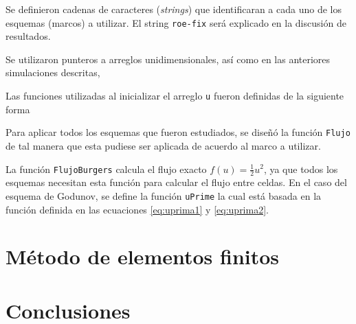 \documentclass[12pt]{article}
\begin{document}
	
	
	Se definieron cadenas de caracteres (\textit{strings}) que identificaran a cada uno de los esquemas (marcos) a utilizar. El string \texttt{roe-fix} será explicado en la discusión de resultados.
	
	
	Se utilizaron punteros a arreglos unidimensionales, así como en las anteriores simulaciones descritas,
	
	
	
	
	
	Las funciones utilizadas al inicializar el arreglo \texttt{u} fueron definidas de la siguiente forma
	
	
	
	Para aplicar todos los esquemas que fueron estudiados, se diseñó la función \texttt{Flujo} de tal manera que esta pudiese ser aplicada de acuerdo al marco a utilizar.
 	
 	
 	
 	La función \texttt{FlujoBurgers} calcula el flujo exacto $f(u) = \frac{1}{2}u^{2}$, ya que todos los esquemas necesitan esta función para calcular el flujo entre celdas. En el caso del esquema de Godunov, se define la función \texttt{uPrime} la cual está basada en la función definida en las ecuaciones \ref{eq:uprima1} y \ref{eq:uprima2}.
 	
 	
 	
	\section{Método de elementos finitos}
	\section{Conclusiones}
	
	\printbibliography
	
\end{document}
